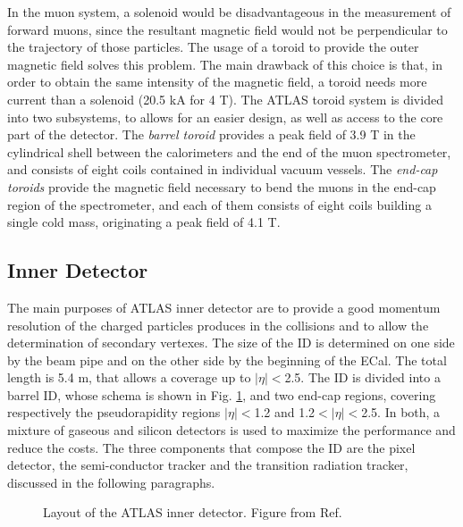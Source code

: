 In the muon system, a solenoid would be disadvantageous in the measurement of forward muons, since the resultant magnetic field would not be perpendicular to the trajectory of those particles. The usage of a toroid to provide the outer magnetic field solves this problem. The main drawback of this choice is that, in order to obtain the same intensity of the magnetic field, a toroid needs more current than a solenoid (20.5 kA for 4 T).
The ATLAS toroid system is divided into two subsystems, to allows for an easier design, as well as access to the core part of the detector.
The \textit{barrel toroid} \cite{ATLAS:1997ac} provides a peak field of 3.9 T in the cylindrical shell between the calorimeters and the end of the muon spectrometer, and consists of eight coils contained in individual vacuum vessels.  
The \textit{end-cap toroids} \cite{ATLAS:1997ab} provide the magnetic field necessary to bend the muons in the end-cap region of the spectrometer, and each of them consists of eight coils building a single cold mass, originating a peak field of 4.1 T. 



\subsection{Inner Detector}

The main purposes of ATLAS inner detector \cite{ATLAS:1997ag,ATLAS:1997af} are to provide a good momentum resolution of the charged particles produces in the collisions and to allow the determination of secondary vertexes. The size of the ID is determined on one side by the beam pipe and on the other side by the beginning of the ECal. The total length is 5.4 m, that allows a coverage up to $|\eta|<$2.5.
The ID is divided into a barrel ID, whose schema is shown in Fig. \ref{fig:atlas:id}, and two end-cap regions, covering respectively the pseudorapidity regions $|\eta|<$1.2 and 1.2$<|\eta|<$2.5. In both, a mixture of gaseous and silicon detectors is used to maximize the performance and reduce the costs. The three components that compose the ID are the pixel detector, the semi-conductor tracker and the transition radiation tracker, discussed in the following paragraphs.

\begin{figure}[ht]
\centering
{}
\caption{Layout of the ATLAS inner detector. Figure from Ref. \cite{Potamianos:2016ptf}}
\label{fig:atlas:id}
\end{figure}


